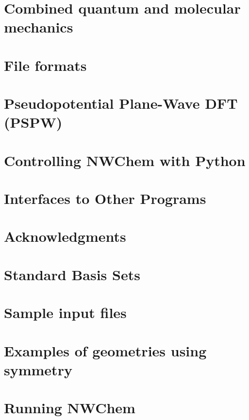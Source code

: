 \chapter{Combined quantum and molecular mechanics}


\chapter{File formats}


\chapter{Pseudopotential Plane-Wave DFT (PSPW)}


\chapter{Controlling NWChem with Python}


\chapter{Interfaces to Other Programs}


\clearpage
\chapter{Acknowledgments}

\clearpage

\appendix

\chapter{Standard Basis Sets}


\chapter{Sample input files}


\chapter{Examples of geometries using symmetry}


\chapter{Running NWChem}


